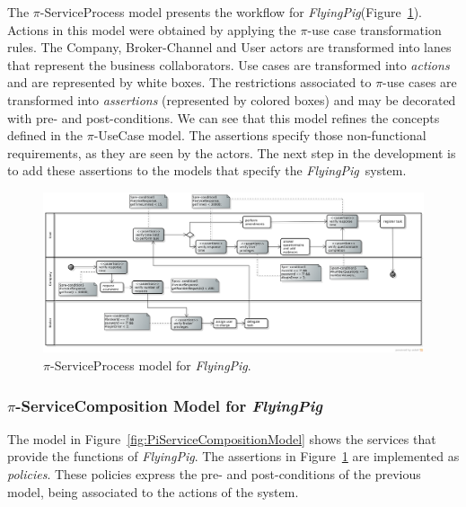 \documentclass{singlecol-new}
\theoremstyle{TH}{
\newtheorem{lemma}{Lemma}
\newtheorem{theorem}[lemma]{Theorem}
\newtheorem{corrolary}[lemma]{Corrolary}
\newtheorem{conjecture}[lemma]{Conjecture}
\newtheorem{proposition}[lemma]{Proposition}
\newtheorem{claim}[lemma]{Claim}
\newtheorem{stheorem}[lemma]{Wrong Theorem}
\newtheorem{algorithm}{Algorithm}
}
\theoremstyle{THrm}{
\newtheorem{definition}{Definition}[section]
\newtheorem{question}{Question}[section]
\newtheorem{remark}{Remark}
\newtheorem{scheme}{Scheme}
}
\theoremstyle{THhit}{
\newtheorem{case}{Case}[section]
}
\theoremstyle{THhsl}{
\newtheorem{example}{Example}
}
\def\FlyingPig{\textsl{FlyingPig}\xspace}
\begin{document}
The $\pi$-ServiceProcess model presents the workflow for \FlyingPig (Figure~\ref{fig:PiServiceProcessModel}).
Actions in this model were obtained by applying the $\pi$-use case transformation rules.
The \textsf{Company}, \textsf{Broker-Channel} and \textsf{User} actors are transformed into lanes that represent the business collaborators.
Use cases are transformed into \textit{actions} and are represented by white boxes.
The restrictions associated to  $\pi$-use cases are transformed into \textit{assertions} (represented by colored boxes) and may be decorated with pre- and post-conditions.
We can see that this model refines the concepts defined in the $\pi$-UseCase model.
The assertions specify those non-functional requirements, as they are seen by the actors.
The next step in the development is to add these assertions to the models that specify the \FlyingPig\ system.

\begin{figure}[h]
\centering
\includegraphics[width=1.0\textwidth]{./figures/ServiceProcessGeneralCut.png}
\caption{$\pi$-ServiceProcess model for \FlyingPig.\label{fig:PiServiceProcessModel}}
\end{figure}


\subsubsection{$\pi$-ServiceComposition Model for \FlyingPig}

The model in Figure~\ref{fig:PiServiceCompositionModel}
shows  the services that provide the functions of \FlyingPig.
The assertions in Figure~\ref{fig:PiServiceProcessModel} are implemented as \textit{policies}.
These policies express the pre- and post-conditions of the previous model, being  associated to the actions of the system.
\end{document}
